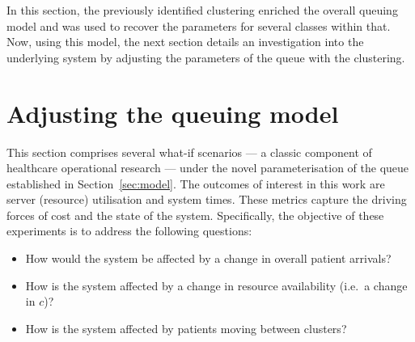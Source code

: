 \begin{table}
    \centering
    \caption{A comparison of the observed data, and the best and worst simulated
        data based on the model parameters and summary statistics for length of
    stay (LOS).}\label{tab:comparison}
\end{table}

In this section, the previously identified clustering enriched the overall
queuing model and was used to recover the parameters for several classes within
that. Now, using this model, the next section details an investigation into the
underlying system by adjusting the parameters of the queue with the clustering.

\section{Adjusting the queuing model}\label{sec:scenarios}

This section comprises several what-if scenarios --- a classic component of
healthcare operational research --- under the novel parameterisation of the
queue established in Section~\ref{sec:model}. The outcomes of interest in this
work are server (resource) utilisation and system times. These metrics capture
the driving forces of cost and the state of the system. Specifically, the
objective of these experiments is to address the following questions:
\begin{itemize}
    \item How would the system be affected by a change in overall patient
        arrivals?
    \item How is the system affected by a change in resource availability (i.e.\
        a change in \(c\))?
    \item How is the system affected by patients moving between clusters?
\end{itemize}

